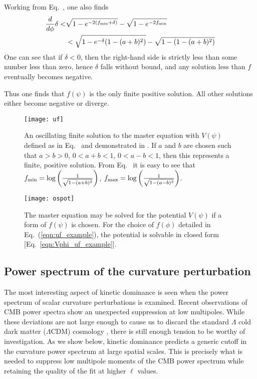 Working from Eq.\ , one also finds
%
\begin{align}
  \frac{d}{d\phi}\delta 
  <&
  \sqrt{1-e^{-2(f_\mathrm{min}+\delta)}} -\sqrt{1-e^{-2f_\mathrm{min}}} 
  \nonumber
  \\
  &<
  \sqrt{1-e^{-\delta}({1-(a+b)^2})} - \sqrt{1-({1-(a+b)^2})}
\end{align}
%
One can see that if $\delta<0$, then the right-hand side is strictly
less than some number less than zero, hence $\delta$ falls without
bound, and any solution less than $f$ eventually becomes negative. 

Thus one finds that $f(\psi)$ is the only finite positive solution.
All other solutions either become negative or diverge.





%
\begin{figure}
  \centering
  \texttt{[image: uf]}
  \caption{An oscillating finite solution to the master equation
    \protect{} with $V(\psi)$ defined as in Eq.\
    \protect{} and demonstrated in
    \protect{}. If $a$ and $b$ are chosen such
    that $a>b>0$, $0<a+b<1$, $0<a-b<1$, then this represents a finite,
    positive solution.  From Eq.\ \protect\eref{eqn:uf_example} it
    is easy to see that $f_\mathrm{min} =
    \log\left(\frac{1}{\sqrt{1-(a+b)^2}}\right)$,
    $f_\mathrm{max}=\log\left(\frac{1}{\sqrt{1-(a-b)^2}}\right)$.  }
  \label{fig:figure_uf}
\end{figure}
%

%
\begin{figure}
  \centering
  \texttt{[image: ospot]}
  \caption{The master equation may be solved for the potential
    $V(\psi)$ if a form of $f(\psi)$ is chosen. For the choice of
    $f(\phi)$ detailed in Eq.\ (\protect\ref{eqn:uf_example}), the
    potential is solvable in closed form 
    [Eq.\ \protect\ref{eqn:Vphi_uf_example}]. 
  }
  \label{fig:figure_ospot}
\end{figure}
%





\subsection{Power spectrum of the curvature perturbation}
\label{sec:powspec}

The most interesting aspect of kinetic dominance is seen when the
power spectrum of scalar curvature perturbations is examined. Recent
observations of CMB power spectra
\citep{hinshaw_nine-year_2012,planck_collaboration_planck_2013} show
an unexpected suppression at low multipoles. While these deviations
are not large enough to cause us to discard the standard $\Lambda$
cold dark matter ($\Lambda$CDM) cosmology
\citep{1998PhRvD..57.2207B,2000PhRvD..62l3513B,2004PhRvD..69f3516D},
there is still enough tension to be worthy of investigation.  As we
show below, kinetic dominance predicts a generic cutoff in the
curvature power spectrum at large spatial scales. This is precisely
what is needed to suppress low multipole moments of the CMB power
spectrum while retaining the quality of the fit at higher $\ell$
values.

